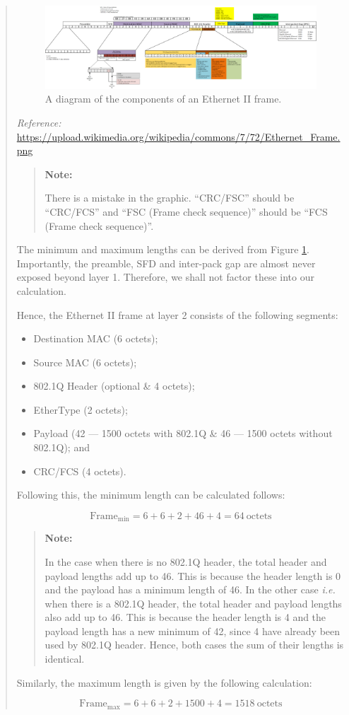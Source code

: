 \documentclass{article}
\newenvironment{ans}
{\fbox{Answer}\begin{quote}\nopagebreak}
{\end{quote}}
\newcommand\Refer[1]{
\begin{center}
{\small\textit{Reference:} \url{#1}}
\end{center}
}%
\newcommand\ie{\emph{i.e.}}
\newenvironment{note}{%
\begin{quote}
\begin{tcolorbox}[colback=gray!10,arc=0mm,boxrule=0pt]
\raggedright
\textbf{Note:}%
}{%
\end{tcolorbox}
\end{quote}%
}
\begin{document}
\begin{ans}
\begin{figure}[H]
\centering
\includegraphics[width=16cm]{data/q4.2-ethernet-diagram.png}
\caption{A diagram of the components of an Ethernet II frame.}
\label{fig:eth2-frame}
\end{figure}

\Refer{https://upload.wikimedia.org/wikipedia/commons/7/72/Ethernet_Frame.png}

\begin{note}
There is a mistake in the graphic. ``CRC/FSC'' should be
``CRC/FCS'' and ``FSC (Frame check sequence)'' should be ``FCS
(Frame check sequence)''.
\end{note}

The minimum and maximum lengths can be derived from Figure
\ref{fig:eth2-frame}. Importantly, the preamble, SFD and
inter-pack gap are almost never exposed beyond layer 1.
Therefore, we shall not factor these into our calculation.

Hence, the Ethernet II frame at layer 2 consists of the
following segments:

\begin{itemize}
\item Destination MAC (6 octets);
\item Source MAC (6 octets);
\item 802.1Q Header (optional \& 4 octets);
\item EtherType (2 octets);
\item Payload (42 --- 1500 octets with 802.1Q \& 46 --- 1500
      octets without 802.1Q); and
\item CRC/FCS (4 octets).
\end{itemize}

Following this, the minimum length can be calculated
follows:

$$
{\text{Frame}}_{\text{min}} = 6 + 6 + 2 + 46 + 4 = 64\ \text{octets}
$$

\begin{note}
In the case when there is no 802.1Q header, the total header and
payload lengths add up to 46. This is because the header length
is 0 and the payload has a minimum length of 46. In the other
case \ie{} when there is a 802.1Q header, the total header and
payload lengths also add up to 46. This is because the header
length is 4 and the payload length has a new minimum of 42,
since 4 have already been used by 802.1Q header. Hence, both
cases the sum of their lengths is identical.
\end{note}

Similarly, the maximum length is given by the following
calculation:

$$
{\text{Frame}}_{\text{max}} = 6 + 6 + 2 + 1500 + 4 = 1518\ \text{octets}
$$
\end{ans}
\end{document}
